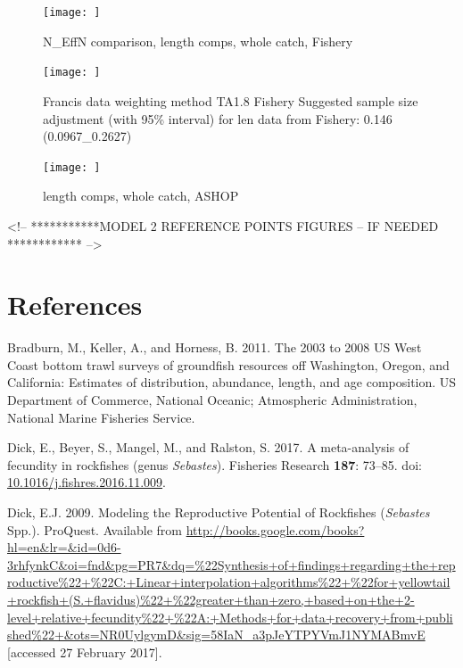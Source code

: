 \documentclass[12pt,]{article}
\begin{document}
\begin{figure}
\centering
\texttt{[image: ]}
\caption{N\_EffN comparison, length comps, whole catch, Fishery
\label{fig:mod1_8_}}
\end{figure}

\begin{figure}
\centering
\texttt{[image: ]}
\caption{Francis data weighting method TA1.8 Fishery Suggested sample
size adjustment (with 95\% interval) for len data from Fishery: 0.146
(0.0967\_0.2627) \label{fig:mod1_9_}}
\end{figure}

\begin{figure}
\centering
\texttt{[image: ]}
\caption{length comps, whole catch, ASHOP \label{fig:mod1_10_}}
\end{figure}

\FloatBarrier

\FloatBarrier

\FloatBarrier

\FloatBarrier

\FloatBarrier

\FloatBarrier

\FloatBarrier
<!-- ***********MODEL 2 REFERENCE POINTS FIGURES  -- IF NEEDED ************ -->

\newpage

\color{black}

\section*{References}\label{references}

\renewcommand{\thepage}{}

\hypertarget{refs}{}
\hypertarget{ref-bradburn_2003_2011}{}
Bradburn, M., Keller, A., and Horness, B. 2011. The 2003 to 2008 US West
Coast bottom trawl surveys of groundfish resources off Washington,
Oregon, and California: Estimates of distribution, abundance, length,
and age composition. US Department of Commerce, National Oceanic;
Atmospheric Administration, National Marine Fisheries Service.

\hypertarget{ref-dick_meta-analysis_2017}{}
Dick, E., Beyer, S., Mangel, M., and Ralston, S. 2017. A meta-analysis
of fecundity in rockfishes (genus \emph{Sebastes}). Fisheries Research
\textbf{187}: 73--85. doi:
\href{https://doi.org/10.1016/j.fishres.2016.11.009}{10.1016/j.fishres.2016.11.009}.

\hypertarget{ref-dick_modeling_2009}{}
Dick, E.J. 2009. Modeling the Reproductive Potential of Rockfishes
(\emph{Sebastes} Spp.). ProQuest. Available from
\url{http://books.google.com/books?hl=en\&lr=\&id=0d6-3rhfynkC\&oi=fnd\&pg=PR7\&dq=\%22Synthesis+of+findings+regarding+the+reproductive\%22+\%22C:+Linear+interpolation+algorithms\%22+\%22for+yellowtail+rockfish+(S.+flavidus)\%22+\%22greater+than+zero,+based+on+the+2-level+relative+fecundity\%22+\%22A:+Methods+for+data+recovery+from+published\%22+\&ots=NR0UylgymD\&sig=58IaN_a3pJeYTPYVmJ1NYMABmvE}
{[}accessed 27 February 2017{]}.
\end{document}
